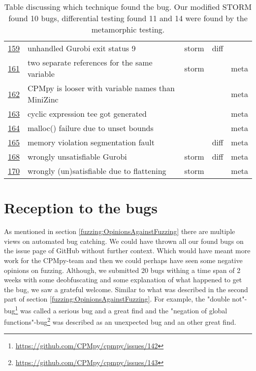 \begin{table}[]
\begin{tabular}{lllll}
		\href{https://github.com/CPMpy/cpmpy/issues/159}{159}   & unhandled Gurobi exit status 9                            & storm          & diff         &              \\
		\href{https://github.com/CPMpy/cpmpy/issues/161}{161}   & two separate references for the same variable             & storm          &              & meta         \\
		\href{https://github.com/CPMpy/cpmpy/issues/162}{162}   & CPMpy is looser with variable names than MiniZinc         &                &              & meta         \\
		\href{https://github.com/CPMpy/cpmpy/issues/163}{163}   & cyclic expression tee got generated                       &                &              & meta         \\
		\href{https://github.com/CPMpy/cpmpy/issues/164}{164}   & malloc() failure due to unset bounds                      &                &              & meta         \\
		\href{https://github.com/CPMpy/cpmpy/issues/165}{165}   & memory violation segmentation fault                       &                & diff         & meta         \\
		\href{https://github.com/CPMpy/cpmpy/issues/168}{168}   & wrongly unsatisfiable Gurobi                              & storm          & diff         & meta         \\
		\href{https://github.com/CPMpy/cpmpy/issues/170}{170}   & wrongly (un)satisfiable due to flattening                 & storm          &              & meta         \\ \bottomrule
	\end{tabular}
	\caption{Table discussing which technique found the bug. Our modified STORM found 10 bugs, differential testing found 11 and 14 were found by the metamorphic testing.}
	\label{tab:bug:Technique}
\end{table}


\section{Reception to the bugs} 
As mentioned in section \ref{fuzzing:OpinionsAgainstFuzzing} there are multiple views on automated bug catching. We could have thrown all our found bugs on the issue page of GitHub without further context. Which would have meant more work for the CPMpy-team and then we could perhaps have seen some negative opinions on fuzzing. 
Although, we submitted 20 bugs withing a time span of 2 weeks with some deobfuscating and some explanation of what happened to get the bug, we saw a grateful welcome. Similar to what was described in the second part of section \ref{fuzzing:OpinionsAgainstFuzzing}. 
For example, the "double not"-bug\footnote{\url{https://github.com/CPMpy/cpmpy/issues/142}} was called a serious bug and a great find and 
the "negation of global functions"-bug\footnote{\url{https://github.com/CPMpy/cpmpy/issues/143}} was described as an unexpected bug and an other great find.

